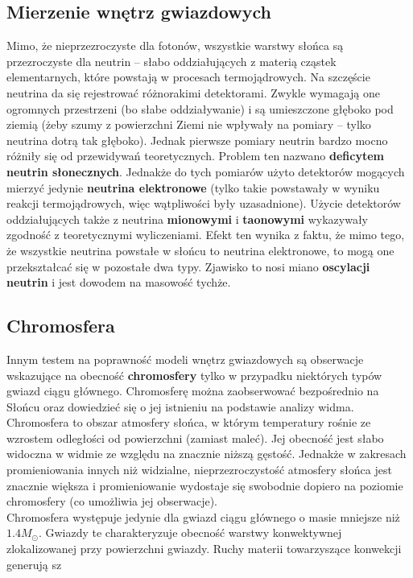 \documentclass[../index.tex]{subfiles}
\begin{document}
        \subsection{Mierzenie wnętrz gwiazdowych}
            Mimo, że nieprzezroczyste dla fotonów, wszystkie warstwy słońca są przezroczyste dla neutrin – słabo oddziałujących z materią cząstek elementarnych, które powstają w procesach termojądrowych. Na szczęście neutrina da się rejestrować różnorakimi detektorami. Zwykle wymagają one ogromnych przestrzeni (bo słabe oddziaływanie) i są umieszczone głęboko pod ziemią (żeby szumy z powierzchni Ziemi nie wpływały na pomiary – tylko neutrina dotrą tak głęboko). Jednak pierwsze pomiary neutrin bardzo mocno różniły się od przewidywań teoretycznych. Problem ten nazwano \textbf{deficytem neutrin słonecznych}. Jednakże do tych pomiarów użyto detektorów mogących mierzyć jedynie \textbf{neutrina elektronowe} (tylko takie powstawały w wyniku reakcji termojądrowych, więc wątpliwości były uzasadnione). Użycie detektorów oddziałujących także z neutrina \textbf{mionowymi} i \textbf{taonowymi} wykazywały zgodność z teoretycznymi wyliczeniami. Efekt ten wynika z faktu, że mimo tego, że wszystkie neutrina powstałe w słońcu to neutrina elektronowe, to mogą one przekształcać się w pozostałe dwa typy. Zjawisko to nosi miano \textbf{oscylacji neutrin} i jest dowodem na masowość tychże.
        \subsection{Chromosfera}
            Innym testem na poprawność modeli wnętrz gwiazdowych są obserwacje wskazujące na obecność \textbf{chromosfery} tylko w przypadku niektórych typów gwiazd ciągu głównego. Chromosferę można zaobserwować bezpośrednio na Słońcu oraz dowiedzieć się o jej istnieniu na podstawie analizy widma. Chromosfera to obszar atmosfery słońca, w którym temperatury rośnie ze wzrostem odległości od powierzchni (zamiast maleć). Jej obecność jest słabo widoczna w widmie ze względu na znacznie niższą gęstość. Jednakże w zakresach promieniowania innych niż widzialne, nieprzezroczystość atmosfery słońca jest znacznie większa i promieniowanie wydostaje się swobodnie dopiero na poziomie chromosfery (co umożliwia jej obserwacje). \\
            Chromosfera występuje jedynie dla gwiazd ciągu głównego o masie mniejsze niż \(1.4 M_\odot\). Gwiazdy te charakteryzuje obecność warstwy konwektywnej zlokalizowanej przy powierzchni gwiazdy. Ruchy materii towarzyszące konwekcji generują sz
\end{document}
